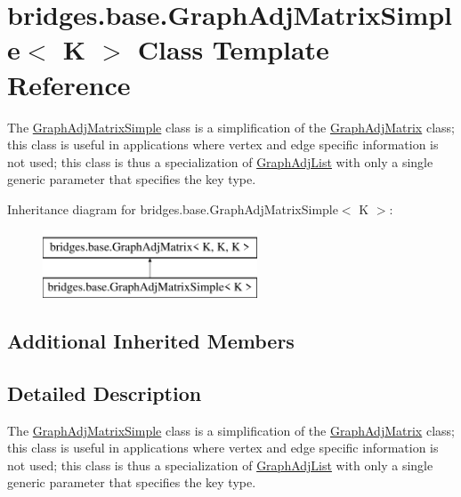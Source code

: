 \hypertarget{classbridges_1_1base_1_1_graph_adj_matrix_simple}{}\section{bridges.\+base.\+Graph\+Adj\+Matrix\+Simple$<$ K $>$ Class Template Reference}
\label{classbridges_1_1base_1_1_graph_adj_matrix_simple}


The \mbox{\hyperlink{classbridges_1_1base_1_1_graph_adj_matrix_simple}{Graph\+Adj\+Matrix\+Simple}} class is a simplification of the \mbox{\hyperlink{classbridges_1_1base_1_1_graph_adj_matrix}{Graph\+Adj\+Matrix}} class; this class is useful in applications where vertex and edge specific information is not used; this class is thus a specialization of \mbox{\hyperlink{classbridges_1_1base_1_1_graph_adj_list}{Graph\+Adj\+List}} with only a single generic parameter that specifies the key type.  


Inheritance diagram for bridges.\+base.\+Graph\+Adj\+Matrix\+Simple$<$ K $>$\+:\begin{figure}[H]
\begin{center}
\leavevmode
\includegraphics[height=2.000000cm]{classbridges_1_1base_1_1_graph_adj_matrix_simple}
\end{center}
\end{figure}
\subsection*{Additional Inherited Members}


\subsection{Detailed Description}
The \mbox{\hyperlink{classbridges_1_1base_1_1_graph_adj_matrix_simple}{Graph\+Adj\+Matrix\+Simple}} class is a simplification of the \mbox{\hyperlink{classbridges_1_1base_1_1_graph_adj_matrix}{Graph\+Adj\+Matrix}} class; this class is useful in applications where vertex and edge specific information is not used; this class is thus a specialization of \mbox{\hyperlink{classbridges_1_1base_1_1_graph_adj_list}{Graph\+Adj\+List}} with only a single generic parameter that specifies the key type. 

